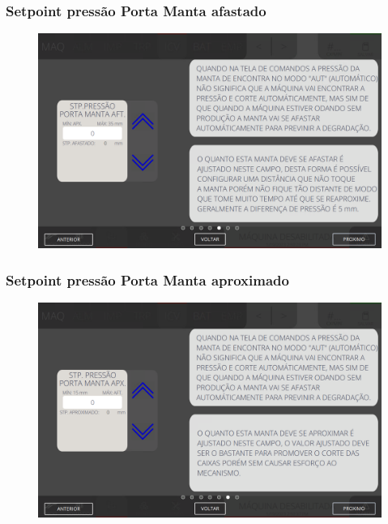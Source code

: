 \newpage
\thispagestyle{fancy}
\vspace*{40 pt}
\subsubsection{\small{Setpoint pressão Porta Manta afastado}} \label{sec:telaAjustesCorteEVincoSetpointPressaoPortaMantaAfastado}
\vspace*{\fill}
\begin{figure}[h]
    \centering
    \includegraphics[width=576 px,height=360 px]{src/imagesICV/06-dryCutter/settings/e-5ERRO.png}
\end{figure}
\vspace*{\fill}

\newpage
\thispagestyle{fancy}
\vspace*{40 pt}
\subsubsection{\small{Setpoint pressão Porta Manta aproximado}} \label{sec:telaAjustesCorteEVincoSetpointPressaoPortaMantaAproximado}
\vspace*{\fill}
\begin{figure}[h]
    \centering
    \includegraphics[width=576 px,height=360 px]{src/imagesICV/06-dryCutter/settings/e-6.png}
\end{figure}
\vspace*{\fill}

